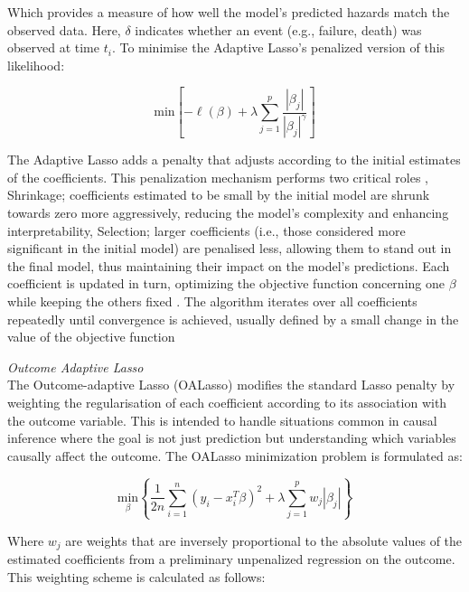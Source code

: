 \noindent Which provides a measure of how well the model's predicted hazards match the observed data. Here, \(\delta\) indicates whether an event (e.g., failure, death) was observed at time \(t_{i}\). To minimise the Adaptive Lasso's penalized version of this likelihood:

\begin{equation} \label{eq:adaptlasso}
\text{min}\left[ -\ell(\beta) + \lambda \sum_{j=1}^{p} \frac{|\beta_j|}{|\beta_j|^\gamma} \right]
\end{equation}

\noindent The Adaptive Lasso adds a penalty that adjusts according to the initial estimates of the coefficients. This penalization mechanism performs two critical roles \parencite{zhang_adaptive_2007}, Shrinkage; coefficients estimated to be small by the initial model are shrunk towards zero more aggressively, reducing the model's complexity and enhancing interpretability, Selection; larger coefficients (i.e., those considered more significant in the initial model) are penalised less, allowing them to stand out in the final model, thus maintaining their impact on the model's predictions. Each coefficient is updated in turn, optimizing the objective function concerning one \(\beta\) while keeping the others fixed \parencite{zhang_adaptive_2007}. The algorithm iterates over all coefficients repeatedly until convergence is achieved, usually defined by a small change in the value of the objective function

\textit{Outcome Adaptive Lasso}
\\
\noindent The Outcome-adaptive Lasso (OALasso) \parencite{shortreed_outcome-adaptive_2017} modifies the standard Lasso penalty by weighting the regularisation of each coefficient according to its association with the outcome variable. This is intended to handle situations common in causal inference where the goal is not just prediction but understanding which variables causally affect the outcome. The OALasso minimization \parencite{shortreed_outcome-adaptive_2017} problem is formulated as:

\begin{equation} \label{eq:oalasso}\underset{\beta}{\text{min}} \left\{ \frac{1}{2n} \sum_{i=1}^{n}(y_{i}-x_{i}^{T}\beta)^{2} + \lambda \sum_{j=1}^{p}w_{j}|\beta_{j}|\right\}\end{equation}

\noindent Where \(w_{j}\) are weights that are inversely proportional to the absolute values of the estimated coefficients from a preliminary unpenalized regression on the outcome. This weighting scheme is calculated as follows:

